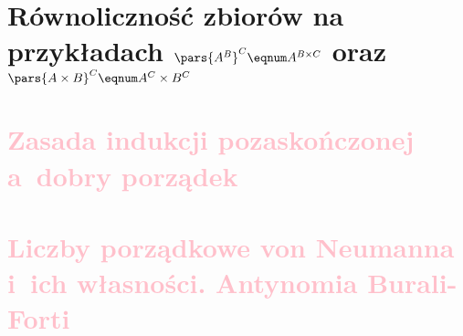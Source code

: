 \section{Równoliczność zbiorów na przykładach \texorpdfstring{\(\pars{A^B}^C \eqnum A^{B \times C}\)}{(A\^B)\^C ~ A\^(B x C)} oraz \texorpdfstring{\(\pars{A \times B}^C \eqnum A^C \times B^C\)}{(A x B)\^C ~ A\^C x B\^C}}
\label{mfi:equinumerosity}


\section{\textcolor{pink}{Zasada indukcji pozaskończonej a~dobry porządek}}


\section{\textcolor{pink}{Liczby porządkowe von Neumanna i~ich własności. Antynomia Burali-Forti}}
